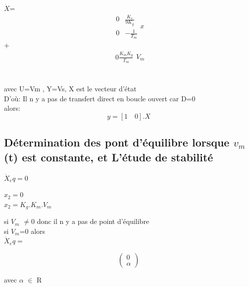 $\dot{X}$=$$\begin{matrix}0&\frac{K_s}{9K_g}\\0&-\frac{1}{T_m}\end{matrix}x$$
\quad+\quad $$\begin{matrix}0
\frac{K_mK_g}{T_m}
\end{matrix}V_m
$$
\\\\

avec U=Vm , Y=Vs, X est le vecteur d'état\\
D'où: Il n y a  pas de transfert direct en boucle ouvert car D=0\\
alors: $$y=[1\quad0].X$$ 



\subsection{Détermination des pont d’équilibre lorsque $v_m$(t) est constante, et L’étude de stabilité }

 \begin{center}
  $\dot{X}_eq=0$
 \end{center}
 \begin{center}
  $x_2=0 $\\
  $x_2=K_g.K_m.V_m$ \\
 \end{center}
 \begin{center}
   si $V_m$ $\ne $0 donc il n y a pas de point d'équilibre \\
   si $V_m$=0 alors\\
   $\dot{X}_eq=$ \end{center}$$\begin{pmatrix} 0\\\alpha \end{pmatrix}$$
 
 \begin{center}
  avec $\alpha$ $\in$ R
 \end{center}
